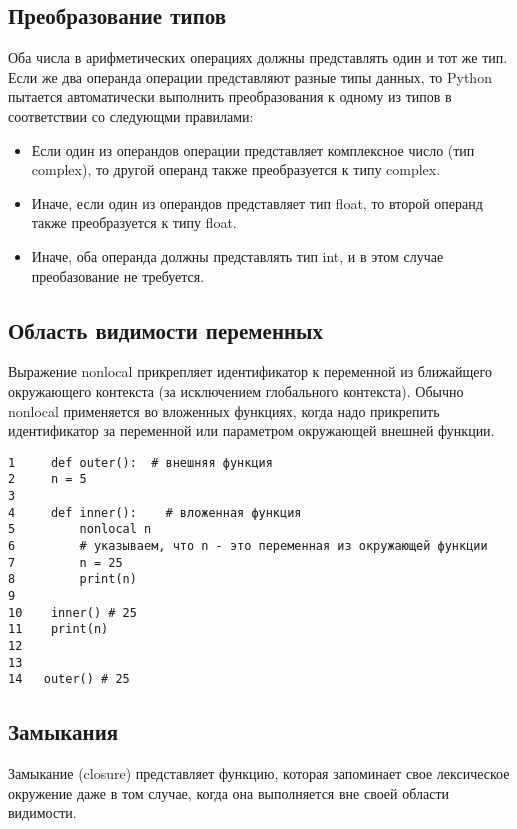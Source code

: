 \documentclass[12pt, a4paper]{article}
\begin{document}
\subsection{Преобразование типов}

Оба числа в арифметических операциях должны представлять один и тот же тип. Если же два операнда операции представляют разные типы данных, то Python пытается автоматически выполнить преобразования к одному из типов в соответствии со следующми правилами:

\begin{itemize}
    \item Если один из операндов операции представляет комплексное число (тип complex), то другой операнд также преобразуется к типу complex.
    \item Иначе, если один из операндов представляет тип float, то второй операнд также преобразуется к типу float.
    \item Иначе, оба операнда должны представлять тип int, и в этом случае преобазование не требуется.
\end{itemize}
    
\subsection{Область видимости переменных}

Выражение nonlocal прикрепляет идентификатор к переменной из ближайщего окружающего контекста (за исключением глобального контекста). Обычно nonlocal применяется во вложенных функциях, когда надо прикрепить идентификатор за переменной или параметром окружающей внешней функции.

\begin{verbatim}
1     def outer():  # внешняя функция
2     n = 5
3  
4     def inner():    # вложенная функция
5         nonlocal n  
6         # указываем, что n - это переменная из окружающей функции
7         n = 25
8         print(n)
9  
10    inner() # 25
11    print(n)
12 
13 
14   outer() # 25
\end{verbatim}

\subsection{Замыкания}

Замыкание (closure) представляет функцию, которая запоминает свое лексическое окружение даже в том случае, когда она выполняется вне своей области видимости.

\vspace{1em}
\end{document}
